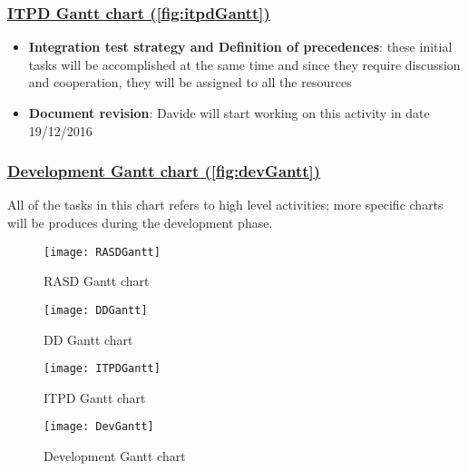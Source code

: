 \subsubsection{\hyperref[fig:itpdGantt]{ITPD Gantt chart (\autoref{fig:itpdGantt})}}
\begin{itemize}
	\item \textbf{Integration test strategy and Definition of precedences}: these initial tasks will be accomplished at the same time and since they require discussion and cooperation, they will be assigned to all the resources
	\item \textbf{Document revision}: Davide will start working on this activity in date 19/12/2016
\end{itemize}

\subsubsection{\hyperref[fig:devGantt]{Development Gantt chart (\autoref{fig:devGantt})}}
All of the tasks in this chart refers to high level activities; more specific charts will be produces during the development phase.

\begin{figure}[h]
	\centering
	\texttt{[image: RASDGantt]}	\caption{
		\label{fig:rasdGantt} 
		RASD Gantt chart
	}
\end{figure}

\begin{figure}[h]
	\centering
	\texttt{[image: DDGantt]}	\caption{
		\label{fig:ddGantt} 
		DD Gantt chart
	}
\end{figure}

\begin{figure}[h]
	\centering
	\texttt{[image: ITPDGantt]}	\caption{
		\label{fig:itpdGantt} 
		ITPD Gantt chart
	}
\end{figure}

\begin{figure}[h]
	\centering
	\texttt{[image: DevGantt]}	\caption{
		\label{fig:devGantt} 
		Development Gantt chart
	}
\end{figure}

\clearpage
